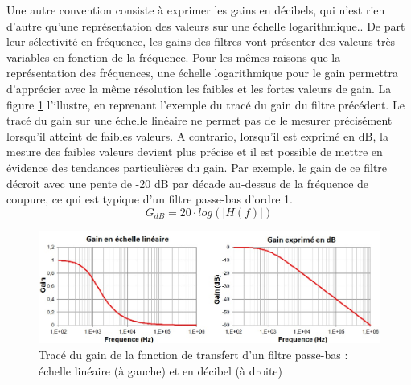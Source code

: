 \documentclass[]{book}
\begin{document}
{	Une autre convention consiste à exprimer les gains en décibels, qui n'est rien d'autre qu'une représentation des valeurs sur une échelle logarithmique.. De part leur sélectivité en fréquence, les gains des filtres vont présenter des valeurs très variables en fonction de la fréquence. Pour les mêmes raisons que la représentation des fréquences, une échelle logarithmique pour le gain permettra d'apprécier avec la même résolution les faibles et les fortes valeurs de gain. La figure \ref{Fig:Effet_Ylin_dB} l'illustre, en reprenant l'exemple du tracé du gain du filtre précédent. Le tracé du gain sur une échelle linéaire ne permet pas de le mesurer précisément lorsqu'il atteint de faibles valeurs. A contrario, lorsqu'il est exprimé en dB, la mesure des faibles valeurs devient plus précise et il est possible de mettre en évidence des tendances particulières du gain. Par exemple, le gain de ce filtre décroit avec une pente de -20 dB par décade au-dessus de la fréquence de coupure, ce qui est typique d'un filtre passe-bas d'ordre 1. 
	\begin{equation}\label{}
	G_{dB} = 20 \cdot log(|H(f)|)
	\end{equation}
	
	\begin{figure}[h!]
		\centering
		\includegraphics[scale=0.6]{images/Effet_Ylin_dB.jpg}
		\caption{Tracé du gain de la fonction de transfert d'un filtre passe-bas : échelle linéaire (à gauche) et en décibel (à droite)}	
		\label{Fig:Effet_Ylin_dB} 
	\end{figure}
	
}
\end{document}
